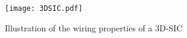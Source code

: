 \begin{figure}[h!]
\begin{center}
\texttt{[image: 3DSIC.pdf]}
\end{center}
\vspace{-0.5cm}
\caption{Illustration of the wiring properties of a 3D-SIC}
\label{fig:3D_SIC_SOC2010}
\end{figure}




